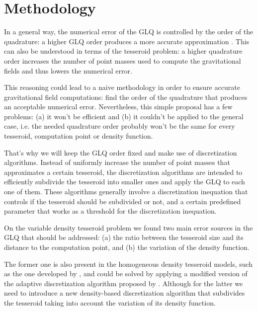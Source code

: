 \documentclass[extra]{gji}
\begin{document}

\section{Methodology}

In a general way, the numerical error of the GLQ is controlled by the 
order of the quadrature: a higher GLQ order produces a more accurate 
approximation \citep{Hildebrand1987}.
This can also be understood in terms of the tesseroid problem: a higher 
quadrature order increases the number of point masses used to compute 
the gravitational fields and thus lowers the numerical error.

This reasoning could lead to a naive methodology in order to ensure 
accurate gravitational field computations: find the order of the 
quadrature that produces an acceptable numerical error.
Nevertheless, this simple proposal has a few problems: (a) it won't be 
efficient \citep{Li2011, Uieda2016} and (b) it couldn't be applied to 
the general case, i.e. the needed quadrature order probably won't be 
the same for every tesseroid, computation point or density function.

That's why we will keep the GLQ order fixed and make use of 
discretization algorithms.
Instead of uniformly increase the number of point masses that 
approximates a certain tesseroid, the discretization algorithms are 
intended to efficiently subdivide the tesseroid into smaller ones and 
apply the GLQ to each one of them.
These algorithms generally involve a discretization inequation that 
controls if the tesseroid should be subdivided or not, and a certain 
predefined parameter that works as a threshold for the discretization 
inequation.

On the variable density tesseroid problem we found two main error 
sources in the GLQ that should be addressed: (a) the ratio between 
the tesseroid size and its distance to the computation point, and (b) 
the variation of the density function.

The former one is also present in the homogeneous density tesseroid 
models, such as the one developed by \citet{Uieda2016}, and could be 
solved by applying a modified version of the adaptive discretization 
algorithm proposed by \citet{Li2011}.
Although for the latter we need to introduce a new density-based 
discretization algorithm that subdivides the tesseroid taking into 
account the variation of its density function.
\end{document}
